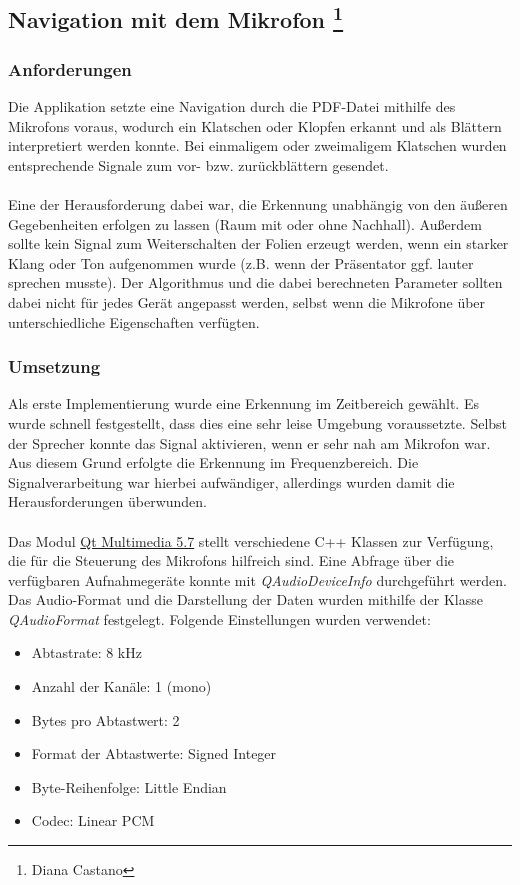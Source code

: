 \subsection[Navigation mit dem Mikrofon]{Navigation mit dem Mikrofon \footnote{Diana Castano}}
\thispagestyle{fancy}

\subsubsection{Anforderungen}
Die Applikation setzte eine Navigation durch die PDF-Datei mithilfe des Mikrofons voraus, wodurch ein Klatschen oder Klopfen erkannt und als Blättern interpretiert werden konnte. Bei einmaligem oder zweimaligem Klatschen wurden entsprechende Signale zum vor- bzw. zurückblättern gesendet. \\
\\
Eine der Herausforderung dabei war, die Erkennung unabhängig von den äußeren Gegebenheiten erfolgen zu lassen (Raum mit oder ohne Nachhall). Außerdem sollte kein Signal zum Weiterschalten der Folien erzeugt werden, wenn ein starker Klang oder Ton aufgenommen wurde (z.B. wenn der Präsentator ggf. lauter sprechen musste). Der Algorithmus und die dabei berechneten Parameter sollten dabei nicht für jedes Gerät angepasst werden, selbst wenn die Mikrofone über unterschiedliche Eigenschaften verfügten. 

\subsubsection{Umsetzung}
Als erste Implementierung wurde eine Erkennung im Zeitbereich gewählt. Es wurde schnell festgestellt, dass dies eine sehr leise Umgebung voraussetzte. Selbst der Sprecher konnte das Signal aktivieren, wenn er sehr nah am Mikrofon war. Aus diesem Grund erfolgte die Erkennung im Frequenzbereich. Die Signalverarbeitung war hierbei aufwändiger, allerdings wurden damit die Herausforderungen überwunden.\\
\\
Das Modul  \href{http://doc.qt.io/qt-5/qtmultimedia-index.html}{Qt Multimedia 5.7} stellt verschiedene C++ Klassen zur Verfügung, die für die Steuerung des Mikrofons hilfreich sind. Eine Abfrage über die verfügbaren Aufnahmegeräte konnte mit \textit{QAudioDeviceInfo} durchgeführt werden. Das Audio-Format und die Darstellung der Daten wurden mithilfe der Klasse \textit{QAudioFormat} festgelegt. Folgende Einstellungen wurden verwendet:

\begin{center}
	\begin{itemize}
		\item Abtastrate: 8 kHz
		\item Anzahl der Kanäle: 1 (mono)
		\item Bytes pro Abtastwert: 2
		\item Format der Abtastwerte: Signed Integer
		\item Byte-Reihenfolge: Little Endian
		\item Codec: Linear PCM	
	\end{itemize}
\end{center}

